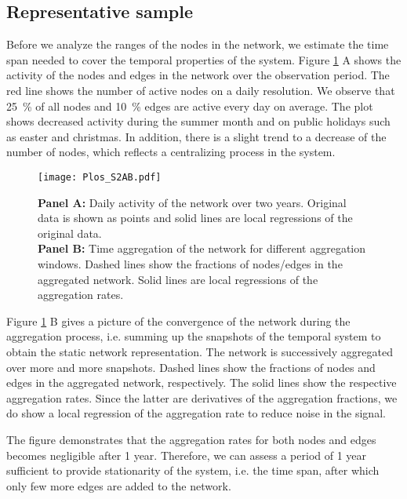 \subsection{Representative sample}
Before we analyze the ranges of the nodes in the network, we estimate the time span needed to cover the temporal properties of the system.
Figure \ref{fig:Plos_S1} A shows the activity of the nodes and edges in the network over the observation period.
The red line shows the number of active nodes on a daily resolution.
We observe that 25~\% of all nodes and 10~\% edges are active every day on average.
The plot shows decreased activity during the summer month and on public holidays such as easter and christmas.
In addition, there is a slight trend to a decrease of the number of nodes, which reflects a centralizing process in the system.
%
\begin{figure}[htbp]
\begin{center}
\texttt{[image: Plos\_S2AB.pdf]}
\caption{\textbf{Panel A:} Daily activity of the network over two years.
Original data is shown as points and solid lines are local regressions of the original data.\\
\textbf{Panel B:} Time aggregation of the network for different aggregation windows.
Dashed lines show the fractions of nodes/edges in the aggregated network.
Solid lines are local regressions of the aggregation rates.
}
\label{fig:Plos_S1}
\end{center}
\end{figure}

Figure \ref{fig:Plos_S1} B gives a picture of the convergence of the network during the aggregation process, i.e. summing up the snapshots of the temporal system to obtain the static network representation.
The network is successively aggregated over more and more snapshots.
Dashed lines show the fractions of nodes and edges in the aggregated network, respectively.
The solid lines show the respective aggregation rates.
Since the latter are derivatives of the aggregation fractions, we do show a local regression of the aggregation rate to reduce noise in the signal.

The figure demonstrates that the aggregation rates for both nodes and edges becomes negligible after 1 year.
Therefore, we can assess a period of 1 year sufficient to provide stationarity of the system, i.e. the time span, after which only few more edges are added to the network.

